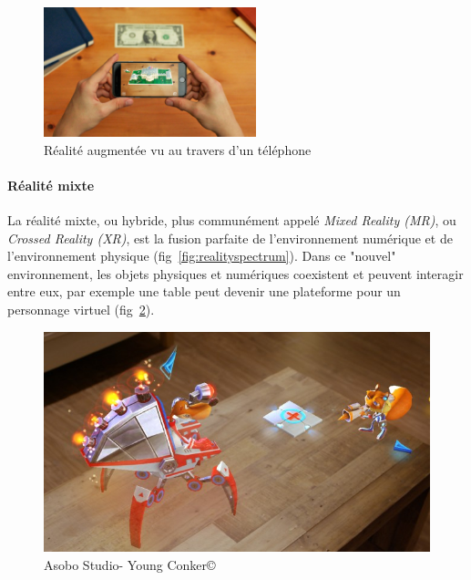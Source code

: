 \begin{figure}[H]
\centering
\includegraphics[width=0.55\textwidth]{images/AR}
\caption{Réalité augmentée vu au travers d'un téléphone\protect\footnotemark}\label{fig:AR}
\end{figure}

\paragraph{Réalité mixte}
La réalité mixte, ou hybride, plus communément appelé \emph{Mixed Reality (MR)}, ou \emph{Crossed Reality (XR)}, est la fusion parfaite de l'environnement numérique et de l'environnement physique (fig~\ref{fig:realityspectrum}). Dans ce "nouvel" environnement, les objets physiques et numériques coexistent et peuvent interagir entre eux, par exemple une table peut devenir une plateforme pour un personnage virtuel (fig~\ref{fig:youngconker}).

\begin{figure}[H]
\centering
\includegraphics[scale=0.4]{images/youngconker}
\caption{Asobo Studio\texttrademark - Young Conker\copyright}
\label{fig:youngconker}
\end{figure}

